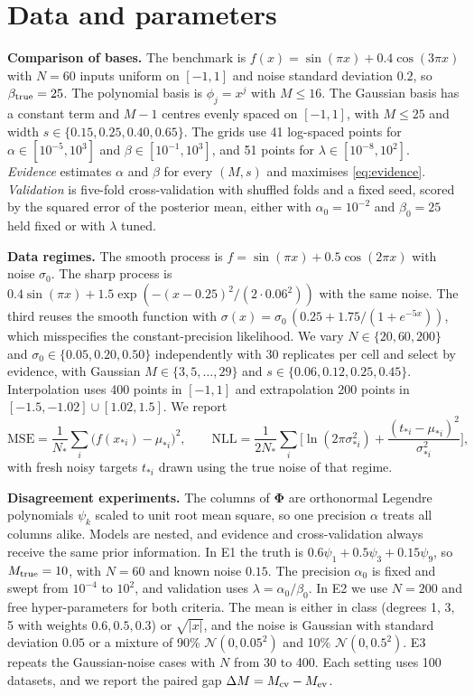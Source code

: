 \documentclass[10pt,a4paper]{article}
\newcommand{\bPhi}{\bm{\Phi}}
\begin{document}
\section{Data and parameters}
\textbf{Comparison of bases.} The benchmark is $f(x)=\sin(\pi x)+0.4\cos(3\pi x)$ with $N=60$ inputs uniform on $[-1,1]$ and noise standard deviation $0.2$, so $\beta_{\rm true}=25$. The polynomial basis is $\phi_j=x^j$ with $M\le16$. The Gaussian basis has a constant term and $M-1$ centres evenly spaced on $[-1,1]$, with $M\le25$ and width $s\in\{0.15,0.25,0.40,0.65\}$. The grids use 41 log-spaced points for $\alpha\in[10^{-5},10^{3}]$ and $\beta\in[10^{-1},10^{3}]$, and 51 points for $\lambda\in[10^{-8},10^{2}]$. \emph{Evidence} estimates $\alpha$ and $\beta$ for every $(M,s)$ and maximises \eqref{eq:evidence}. \emph{Validation} is five-fold cross-validation with shuffled folds and a fixed seed, scored by the squared error of the posterior mean, either with $\alpha_0=10^{-2}$ and $\beta_0=25$ held fixed or with $\lambda$ tuned.

\textbf{Data regimes.} The smooth process is $f=\sin(\pi x)+0.5\cos(2\pi x)$ with noise $\sigma_0$. The sharp process is $0.4\sin(\pi x)+1.5\exp(-(x-0.25)^2/(2\cdot0.06^2))$ with the same noise. The third reuses the smooth function with $\sigma(x)=\sigma_0\,(0.25+1.75/(1+e^{-5x}))$, which misspecifies the constant-precision likelihood. We vary $N\in\{20,60,200\}$ and $\sigma_0\in\{0.05,0.20,0.50\}$ independently with 30 replicates per cell and select by evidence, with Gaussian $M\in\{3,5,\dots,29\}$ and $s\in\{0.06,0.12,0.25,0.45\}$. Interpolation uses 400 points in $[-1,1]$ and extrapolation 200 points in $[-1.5,-1.02]\cup[1.02,1.5]$. We report
\begin{equation}
\mathrm{MSE}=\frac1{N_*}\sum_i\big(f(x_{*i})-\mu_{*i}\big)^2,\qquad
\mathrm{NLL}=\frac1{2N_*}\sum_i\Big[\ln(2\pi\sigma_{*i}^2)+\frac{(t_{*i}-\mu_{*i})^2}{\sigma_{*i}^2}\Big],
\label{eq:metrics}
\end{equation}
with fresh noisy targets $t_{*i}$ drawn using the true noise of that regime.

\textbf{Disagreement experiments.} The columns of $\bPhi$ are orthonormal Legendre polynomials $\psi_k$ scaled to unit root mean square, so one precision $\alpha$ treats all columns alike. Models are nested, and evidence and cross-validation always receive the same prior information. In E1 the truth is $0.6\psi_1+0.5\psi_3+0.15\psi_9$, so $M_{\rm true}=10$, with $N=60$ and known noise $0.15$. The precision $\alpha_0$ is fixed and swept from $10^{-4}$ to $10^{2}$, and validation uses $\lambda=\alpha_0/\beta_0$. In E2 we use $N=200$ and free hyper-parameters for both criteria. The mean is either in class (degrees 1, 3, 5 with weights $0.6,0.5,0.3$) or $\sqrt{|x|}$, and the noise is Gaussian with standard deviation $0.05$ or a mixture of 90\% $\mathcal{N}(0,0.05^2)$ and 10\% $\mathcal{N}(0,0.5^2)$. E3 repeats the Gaussian-noise cases with $N$ from 30 to 400. Each setting uses 100 datasets, and we report the paired gap $\Delta M=M_{\rm cv}-M_{\rm ev}$.
\end{document}
